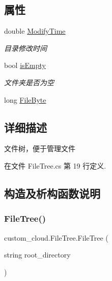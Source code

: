 \subsection*{属性}
\begin{DoxyCompactItemize}
\item 
double \hyperlink{classcustom__cloud_1_1_file_tree_a4483b47b27bbca29ce30e468a19249ee}{Modify\+Time}
\begin{DoxyCompactList}\small\item\em 目录修改时间 \end{DoxyCompactList}\item 
bool \hyperlink{classcustom__cloud_1_1_file_tree_a45fd4d4acc48287782484c4867920190}{is\+Empty}
\begin{DoxyCompactList}\small\item\em 文件夹是否为空 \end{DoxyCompactList}\item 
long \hyperlink{classcustom__cloud_1_1_file_tree_af59f027e29edbc3d32bd8c109607247d}{File\+Byte}
\end{DoxyCompactItemize}


\subsection{详细描述}
文件树，便于管理文件 



在文件 File\+Tree.\+cs 第 19 行定义.



\subsection{构造及析构函数说明}
\mbox{\label{classcustom__cloud_1_1_file_tree_aad8223b6a616724c65459a65c466ed9c}} 
\subsubsection{\texorpdfstring{File\+Tree()}{FileTree()}}
{\footnotesize\ttfamily custom\+\_\+cloud.\+File\+Tree.\+File\+Tree (\begin{DoxyParamCaption}\item[{string}]{root\+\_\+directory }\end{DoxyParamCaption})}



